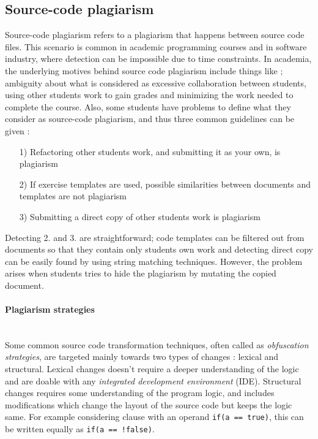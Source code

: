 \subsection{Source-code plagiarism} \label{chap-bg-sc-plag}

Source-code plagiarism refers to a plagiarism that happens between source code files. This 
scenario is common in academic programming courses and in software industry, where detection can be impossible due to time constraints. In academia, the underlying motives behind source code plagiarism include things like \cite{DPPA2008}; ambiguity about what is considered as excessive collaboration between students, using other students work to gain grades and minimizing the work needed to complete the course. Also, some students have problems to define what they consider as source-code plagiarism, and thus three common guidelines can be given \cite{Pieterse2014DecodingCP}:

\begin{enumerate}
    \item[1)] Refactoring other students work, and submitting it as your own, is plagiarism
    \item[2)] If exercise templates are used, possible similarities between documents and templates are not plagiarism
    \item[3)] Submitting a direct copy of other students work is plagiarism
\end{enumerate}

\noindent
Detecting 2. and 3. are straightforward; code templates can be filtered out from documents so that they contain only students own work and detecting direct copy can be easily found by using string matching techniques. However, the problem arises when students tries to hide the plagiarism by mutating the copied document.

\paragraph{Plagiarism strategies}\mbox{}\\
Some common source code transformation techniques, often called as \emph{obfuscation strategies}, are targeted mainly towards two types of changes \cite{DPPA2008}: lexical and structural. Lexical changes doesn't require a deeper understanding of the logic and are doable with any \emph{integrated development environment} (IDE). Structural changes requires some understanding of the program logic, and includes modifications which change the layout of the source code but keeps the logic same. For example considering clause with an operand \texttt{if(a == true)}, this can be written equally as \texttt{if(a == !false)}.


